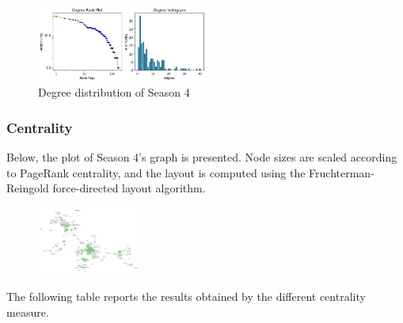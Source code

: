 \documentclass[10pt,twocolumn,letterpaper]{article}
\begin{document}
\begin{figure}[!h]
    \centering
    \includegraphics[width=0.5\textwidth]{img/s4/degree_plot.jpg}
    \caption{\small{Degree distribution of Season 4}}
\end{figure}


\subsubsection{Centrality}

Below, the plot of Season 4's graph is presented. Node sizes are scaled according to PageRank centrality, and the layout is computed using the Fruchterman-Reingold force-directed layout algorithm.


\begin{figure}[!h]
    \centering
    \includegraphics[width=0.3\textwidth]{img/s4/pagerank_graph.jpg}
\end{figure}


The following table reports the results obtained by the different centrality measure.
\end{document}
